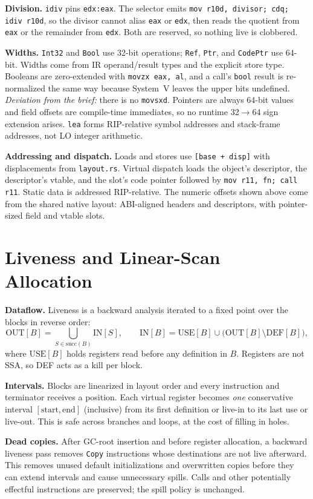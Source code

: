 \documentclass[10pt]{article}
\newcommand{\code}[1]{\texttt{\small #1}}
\begin{document}
\textbf{Division.} \code{idiv} pins \code{edx:eax}. The selector emits \code{mov r10d, divisor; cdq; idiv r10d}, so the divisor cannot alias \code{eax} or \code{edx}, then reads the quotient from \code{eax} or the remainder from \code{edx}. Both are reserved, so nothing live is clobbered.

\textbf{Widths.} \code{Int32} and \code{Bool} use 32-bit operations; \code{Ref}, \code{Ptr}, and \code{CodePtr} use 64-bit. Widths come from IR operand/result types and the explicit store type. Booleans are zero-extended with \code{movzx eax, al}, and a call's \code{bool} result is re-normalized the same way because System~V leaves the upper bits undefined. \emph{Deviation from the brief:} there is no \code{movsxd}. Pointers are always 64-bit values and field offsets are compile-time immediates, so no runtime 32$\to$64 sign extension arises. \code{lea} forms RIP-relative symbol addresses and stack-frame addresses, not LO integer arithmetic.

\textbf{Addressing and dispatch.} Loads and stores use \code{[base + disp]} with displacements from \code{layout.rs}. Virtual dispatch loads the object's descriptor, the descriptor's vtable, and the slot's code pointer followed by \code{mov r11, fn; call r11}. Static data is addressed RIP-relative. The numeric offsets shown above come from the shared native layout: ABI-aligned headers and descriptors, with pointer-sized field and vtable slots.

\section{Liveness and Linear-Scan Allocation}
\textbf{Dataflow.} Liveness is a backward analysis iterated to a fixed point over the blocks in reverse order:
\[
  \mathrm{OUT}[B] = \bigcup_{S \in \mathrm{succ}(B)} \mathrm{IN}[S],
  \qquad
  \mathrm{IN}[B] = \mathrm{USE}[B] \cup \bigl(\mathrm{OUT}[B] \setminus \mathrm{DEF}[B]\bigr),
\]
where $\mathrm{USE}[B]$ holds registers read before any definition in $B$. Registers are not SSA, so DEF acts as a kill per block.

\textbf{Intervals.} Blocks are linearized in layout order and every instruction and terminator receives a position. Each virtual register becomes \emph{one} conservative interval $[\text{start},\text{end}]$ (inclusive) from its first definition or live-in to its last use or live-out. This is safe across branches and loops, at the cost of filling in holes.

\textbf{Dead copies.} After GC-root insertion and before register allocation, a backward liveness pass removes \code{Copy} instructions whose destinations are not live afterward. This removes unused default initializations and overwritten copies before they can extend intervals and cause unnecessary spills. Calls and other potentially effectful instructions are preserved; the spill policy is unchanged.
\end{document}

